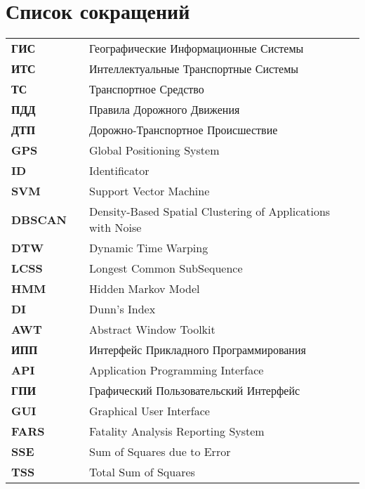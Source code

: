 \section*{Список сокращений}
\label{ch:Список сокращений}

\begin{tabular}{lll}
	\\
	\textbf{ГИС}        & & {Географические Информационные Системы} \\[0.5ex]
	\textbf{ИТС}        & & {Интеллектуальные Транспортные Системы} \\[0.5ex]
	\textbf{ТС}         & & {Транспортное Средство} \\[0.5ex]
	\textbf{ПДД}        & & {Правила Дорожного Движения} \\[0.5ex]
	\textbf{ДТП}        & & {Дорожно-Транспортное Происшествие} \\[0.5ex]
	\textbf{GPS}		& & {Global Positioning System} \\[0.5ex]
	\textbf{ID}			& & {Identificator} \\[0.5ex]
	\textbf{SVM}		& & {Support Vector Machine} \\[0.5ex]
	\textbf{DBSCAN}		& & {Density-Based Spatial Clustering of Applications with Noise} \\[0.5ex]
	\textbf{DTW}        & & {Dynamic Time Warping} \\[0.5ex]
	\textbf{LCSS}       & & {Longest Common SubSequence} \\[0.5ex]
	\textbf{HMM}       	& & {Hidden Markov Model} \\[0.5ex]
	\textbf{DI}			& & {Dunn's Index} \\[0.5ex]
	\textbf{AWT}		& & {Abstract Window Toolkit} \\[0.5ex]
	\textbf{ИПП}        & & {Интерфейс Прикладного Программирования} \\[0.5ex]
	\textbf{API}		& & {Application Programming Interface} \\[0.5ex]	
	\textbf{ГПИ}        & & {Графический Пользовательский Интерфейс} \\[0.5ex]
	\textbf{GUI}		& & {Graphical User Interface} \\[0.5ex]
	\textbf{FARS}       & & {Fatality Analysis Reporting System} \\[0.5ex]
	\textbf{SSE}        & & {Sum of Squares due to Error} \\[0.5ex]
	\textbf{TSS}        & & {Total Sum of Squares} \\[0.5ex]
	
	
\end{tabular}

